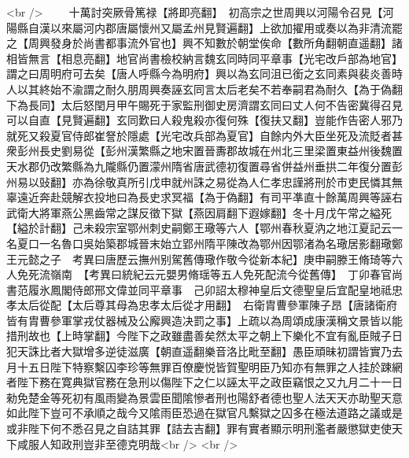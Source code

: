 <br />
　　十萬討突厥骨篤禄【將即亮翻】　初高宗之世周興以河陽令召見【河陽縣自漢以來屬河内郡唐屬懷州又屬孟州見賢遍翻】上欲加擢用或奏以為非清流罷之【周興發身於尚書都事流外官也】興不知數於朝堂俟命【數所角翻朝直遥翻】諸相皆無言【相息亮翻】地官尚書檢校納言魏玄同時同平章事【光宅改戶部為地官】謂之曰周明府可去矣【唐人呼縣今為明府】興以為玄同沮已銜之玄同素與裴炎善時人以其終始不渝謂之耐久朋周興奏誣玄同言太后老矣不若奉嗣君為耐久【為于偽翻下為長同】太后怒閏月甲午賜死于家監刑御史房濟謂玄同曰丈人何不告密冀得召見可以自直【見賢遍翻】玄同歎曰人殺鬼殺亦復何殊【復扶又翻】豈能作告密人邪乃就死又殺夏官侍郎崔詧於隱處【光宅改兵部為夏官】自餘内外大臣坐死及流貶者甚衆彭州長史劉易從【彭州漢繁縣之地宋置晉夀郡故城在州北三里梁置東益州後魏置天水郡仍改繁縣為九隴縣仍置濛州隋省唐武德初復置尋省併益州垂拱二年復分置彭州易以䜴翻】亦為徐敬真所引戊申就州誅之易從為人仁孝忠謹將刑於市吏民憐其無辜遠近奔赴競解衣投地曰為長史求冥福【為于偽翻】有司平凖直十餘萬周興等誣右武衛大將軍燕公黑齒常之謀反徵下獄【燕因肩翻下遐嫁翻】冬十月戊午常之縊死【縊於計翻】己未殺宗室鄂州刺史嗣鄭王璥等六人【鄂州春秋夏汭之地江夏記云一名夏口一名魯口吳始築郡城晉末始立郢州隋平陳改為鄂州因鄂渚為名璥居影翻璥鄭王元懿之子　考異曰唐歷云撫州别駕舊傳璥作敬今從新本紀】庚申嗣滕王脩琦等六人免死流嶺南　【考異曰統紀云元嬰男脩瑶等五人免死配流今從舊傳】　丁卯春官尚書范履氷鳳閣侍郎邢文偉並同平章事　己卯詔太穆神皇后文德聖皇后宜配皇地祗忠孝太后從配【太后尊其母為忠孝太后從才用翻】　右衛胄曹參軍陳子昂【唐諸衛府皆有胄曹參軍掌戎仗器械及公廨興造决罰之事】上疏以為周頌成康漢稱文景皆以能措刑故也【上時掌翻】今陛下之政雖盡善矣然太平之朝上下樂化不宜有亂臣賊子日犯天誅比者大獄增多逆徒滋廣【朝直遥翻樂音洛比毗至翻】愚臣頑昧初謂皆實乃去月十五日陛下特察繫囚李珍等無罪百僚慶悦皆賀聖明臣乃知亦有無罪之人挂於踈網者陛下務在寛典獄官務在急刑以傷陛下之仁以誣太平之政臣竊恨之又九月二十一日勑免楚金等死初有風雨變為景雲臣聞隂慘者刑也陽舒者德也聖人法天天亦助聖天意如此陛下豈可不承順之哉今又隂雨臣恐過在獄官凡繫獄之囚多在極法道路之議或是或非陛下何不悉召見之自詰其罪【詰去吉翻】罪有實者顯示明刑濫者嚴懲獄吏使天下咸服人知政刑豈非至德克明哉<br />
<br />
